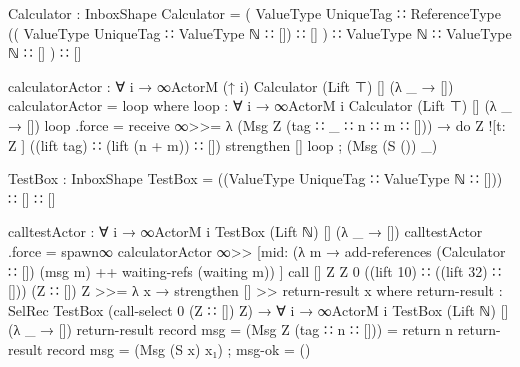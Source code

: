 \begin{code}
Calculator : InboxShape
Calculator = (
  ValueType UniqueTag ∷
  ReferenceType ((
    ValueType UniqueTag ∷
    ValueType ℕ ∷ []) ∷ []
  ) ∷
  ValueType ℕ ∷
  ValueType ℕ ∷ []
  ) ∷ []

calculatorActor : ∀ {i} → ∞ActorM (↑ i) Calculator (Lift ⊤) [] (λ _ → [])
calculatorActor = loop
  where
    loop : ∀ {i} → ∞ActorM i Calculator (Lift ⊤) [] (λ _ → [])
    loop .force = receive ∞>>= λ {
      (Msg Z (tag ∷ _ ∷ n ∷ m ∷ [])) → do
        Z ![t: Z ] ((lift tag) ∷ (lift (n + m)) ∷ [])
        strengthen []
        loop
      ; (Msg (S ()) _) }

TestBox : InboxShape
TestBox = ((ValueType UniqueTag ∷ ValueType ℕ ∷ [])) ∷ [] ∷ []

calltestActor : ∀ {i} → ∞ActorM i TestBox (Lift ℕ) [] (λ _ → [])
calltestActor .force = spawn∞ calculatorActor ∞>>
                       [mid: (λ m → add-references (Calculator ∷ []) (msg m) ++
                                    waiting-refs (waiting m)) ]
                         call [] Z Z 0
                           ((lift 10) ∷ ((lift 32) ∷ []))
                           (Z ∷ []) Z >>=
                       λ x → strengthen [] >>
                       return-result x
  where
    return-result : SelRec TestBox (call-select 0 (Z ∷ []) Z) →
                    ∀ {i} → ∞ActorM i TestBox (Lift ℕ) [] (λ _ → [])
    return-result record { msg = (Msg Z (tag ∷ n ∷ [])) } = return n
    return-result record { msg = (Msg (S x) x₁) ; msg-ok = () }

\end{code}
